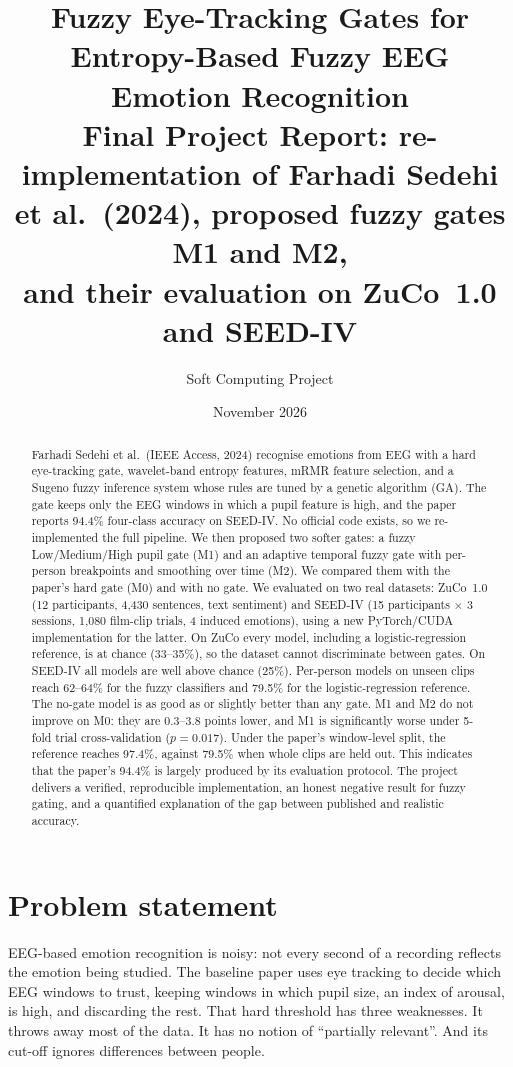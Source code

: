 \documentclass[10pt,a4paper]{article}
\title{Fuzzy Eye-Tracking Gates for Entropy-Based Fuzzy EEG Emotion Recognition\\[2pt]
\large Final Project Report: re-implementation of Farhadi Sedehi et al.\ (2024), proposed fuzzy gates M1 and M2,\\ and their evaluation on ZuCo~1.0 and SEED-IV}
\author{Soft Computing Project}
\date{November 2026}
\begin{document}
\maketitle

\begin{abstract}
\noindent
Farhadi Sedehi et al.\ (IEEE Access, 2024) recognise emotions from EEG with a hard eye-tracking gate, wavelet-band entropy features, mRMR feature selection, and a Sugeno fuzzy inference system whose rules are tuned by a genetic algorithm (GA). The gate keeps only the EEG windows in which a pupil feature is high, and the paper reports 94.4\% four-class accuracy on SEED-IV. No official code exists, so we re-implemented the full pipeline. We then proposed two softer gates: a fuzzy Low/Medium/High pupil gate (M1) and an adaptive temporal fuzzy gate with per-person breakpoints and smoothing over time (M2). We compared them with the paper's hard gate (M0) and with no gate. We evaluated on two real datasets: ZuCo~1.0 (12 participants, 4{,}430 sentences, text sentiment) and SEED-IV (15 participants $\times$ 3 sessions, 1{,}080 film-clip trials, 4 induced emotions), using a new PyTorch/CUDA implementation for the latter.
On ZuCo every model, including a logistic-regression reference, is at chance (33--35\%), so the dataset cannot discriminate between gates. On SEED-IV all models are well above chance (25\%). Per-person models on unseen clips reach 62--64\% for the fuzzy classifiers and 79.5\% for the logistic-regression reference. The no-gate model is as good as or slightly better than any gate. M1 and M2 do not improve on M0: they are 0.3--3.8 points lower, and M1 is significantly worse under 5-fold trial cross-validation ($p{=}0.017$). Under the paper's window-level split, the reference reaches 97.4\%, against 79.5\% when whole clips are held out. This indicates that the paper's 94.4\% is largely produced by its evaluation protocol. The project delivers a verified, reproducible implementation, an honest negative result for fuzzy gating, and a quantified explanation of the gap between published and realistic accuracy.
\end{abstract}

\tableofcontents

\section{Problem statement}
EEG-based emotion recognition is noisy: not every second of a recording reflects the emotion being studied. The baseline paper uses eye tracking to decide which EEG windows to trust, keeping windows in which pupil size, an index of arousal, is high, and discarding the rest. That hard threshold has three weaknesses. It throws away most of the data. It has no notion of ``partially relevant''. And its cut-off ignores differences between people.
\end{document}
